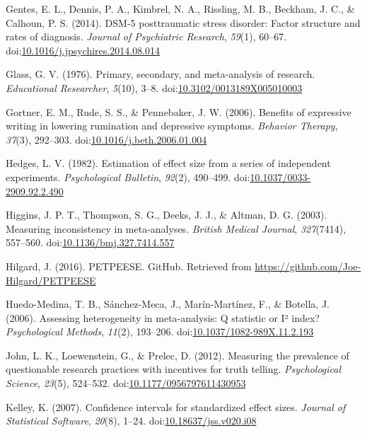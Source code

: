 \documentclass[man]{apa6}
\theoremstyle{definition}
\theoremstyle{definition}
\theoremstyle{definition}
\theoremstyle{remark}
\begin{document}
\hypertarget{ref-Gentes2014}{}
Gentes, E. L., Dennis, P. A., Kimbrel, N. A., Rissling, M. B., Beckham,
J. C., \& Calhoun, P. S. (2014). DSM-5 posttraumatic stress disorder:
Factor structure and rates of diagnosis. \emph{Journal of Psychiatric
Research}, \emph{59}(1), 60--67.
doi:\href{https://doi.org/10.1016/j.jpsychires.2014.08.014}{10.1016/j.jpsychires.2014.08.014}

\hypertarget{ref-Glass1976}{}
Glass, G. V. (1976). Primary, secondary, and meta-analysis of research.
\emph{Educational Researcher}, \emph{5}(10), 3--8.
doi:\href{https://doi.org/10.3102/0013189X005010003}{10.3102/0013189X005010003}

\hypertarget{ref-Gortner2006}{}
Gortner, E. M., Rude, S. S., \& Pennebaker, J. W. (2006). Benefits of
expressive writing in lowering rumination and depressive symptoms.
\emph{Behavior Therapy}, \emph{37}(3), 292--303.
doi:\href{https://doi.org/10.1016/j.beth.2006.01.004}{10.1016/j.beth.2006.01.004}

\hypertarget{ref-Hedges1982}{}
Hedges, L. V. (1982). Estimation of effect size from a series of
independent experiments. \emph{Psychological Bulletin}, \emph{92}(2),
490--499.
doi:\href{https://doi.org/10.1037/0033-2909.92.2.490}{10.1037/0033-2909.92.2.490}

\hypertarget{ref-Higgins2003}{}
Higgins, J. P. T., Thompson, S. G., Deeks, J. J., \& Altman, D. G.
(2003). Measuring inconsistency in meta-analyses. \emph{British Medical
Journal}, \emph{327}(7414), 557--560.
doi:\href{https://doi.org/10.1136/bmj.327.7414.557}{10.1136/bmj.327.7414.557}

\hypertarget{ref-Hilgard2016}{}
Hilgard, J. (2016). PETPEESE. GitHub. Retrieved from
\url{https://github.com/Joe-Hilgard/PETPEESE}

\hypertarget{ref-Huedo-Medina2006}{}
Huedo-Medina, T. B., Sánchez-Meca, J., Marín-Martínez, F., \& Botella,
J. (2006). Assessing heterogeneity in meta-analysis: Q statistic or I²
index? \emph{Psychological Methods}, \emph{11}(2), 193--206.
doi:\href{https://doi.org/10.1037/1082-989X.11.2.193}{10.1037/1082-989X.11.2.193}

\hypertarget{ref-John2012}{}
John, L. K., Loewenstein, G., \& Prelec, D. (2012). Measuring the
prevalence of questionable research practices with incentives for truth
telling. \emph{Psychological Science}, \emph{23}(5), 524--532.
doi:\href{https://doi.org/10.1177/0956797611430953}{10.1177/0956797611430953}

\hypertarget{ref-Kelley2007}{}
Kelley, K. (2007). Confidence intervals for standardized effect sizes.
\emph{Journal of Statistical Software}, \emph{20}(8), 1--24.
doi:\href{https://doi.org/10.18637/jss.v020.i08}{10.18637/jss.v020.i08}
\end{document}
